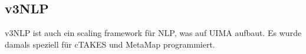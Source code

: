 \subsection{v3NLP}
v3NLP ist auch ein scaling framework für NLP, was auf UIMA aufbaut. Es wurde damals speziell für cTAKES und MetaMap programmiert.



% 
% 
% 
